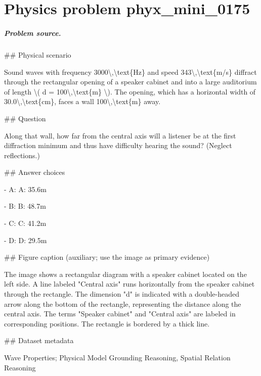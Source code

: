
\chapter{Physics problem phyx\_mini\_0175}
\label{ch:PhyXMiniProblems_problem_phyx_mini_0175}

\paragraph{Problem source.}
\#\# Physical scenario

Sound waves with frequency 3000\textbackslash{},\textbackslash{}text\{Hz\} and speed 343\textbackslash{},\textbackslash{}text\{m/s\} diffract through the rectangular opening of a speaker cabinet and into a large auditorium of length \textbackslash{}( d = 100\textbackslash{},\textbackslash{}text\{m\} \textbackslash{}). The opening, which has a horizontal width of 30.0\textbackslash{},\textbackslash{}text\{cm\}, faces a wall 100\textbackslash{},\textbackslash{}text\{m\} away.

\#\# Question

Along that wall, how far from the central axis will a listener be at the first diffraction minimum and thus have difficulty hearing the sound? (Neglect reflections.)

\#\# Answer choices

- A: A: 35.6m

- B: B: 48.7m

- C: C: 41.2m

- D: D: 29.5m

\#\# Figure caption (auxiliary; use the image as primary evidence)

The image shows a rectangular diagram with a speaker cabinet located on the left side. A line labeled "Central axis" runs horizontally from the speaker cabinet through the rectangle. The dimension "d" is indicated with a double-headed arrow along the bottom of the rectangle, representing the distance along the central axis. The terms "Speaker cabinet" and "Central axis" are labeled in corresponding positions. The rectangle is bordered by a thick line.

\#\# Dataset metadata

Wave Properties; Physical Model Grounding Reasoning, Spatial Relation Reasoning

